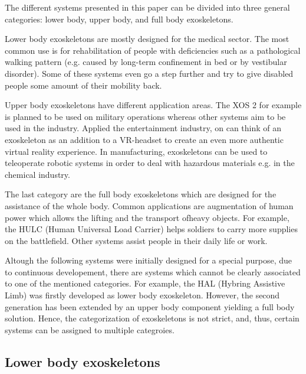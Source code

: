 \documentclass[letterpaper, 10 pt, conference]{ieeeconf}  %
\begin{document}
The different systems presented in this paper can be divided into three general categories: lower body, upper body, and
full body exoskeletons.


Lower body exoskeletons are mostly designed for the medical sector. The most common use is for rehabilitation of people
with deficiencies such as a pathological walking pattern (e.g. caused by long-term confinement in bed or by vestibular
disorder). Some of these systems even go a step further and try to give disabled people some amount of their mobility
back.


Upper body exoskeletons have different application areas. The XOS 2 for example is planned to be used on military
operations whereas other systems aim to be used in the industry. Applied the entertainment industry, on can think of
an exoskeleton as an addition to a VR-headset to create an even more authentic virtual reality experience. In
manufacturing, exoskeletons can be used to teleoperate robotic systems in order to deal with hazardous materials e.g.
in the chemical industry.


The last category are the full body exoskeletons which are designed for the assistance of the whole body.
Common applications are augmentation of human power which allows the lifting and the transport ofheavy objects.
For example, the HULC (Human Universal Load Carrier) helps soldiers to carry more supplies on the battlefield.
Other systems assist people in their daily life or work.


Altough the following systems were initially designed for a special purpose, due to continuous developement,
there are systems which cannot be clearly associated to one of the mentioned categories. For example, the HAL
(Hybring Assistive Limb) was firstly developed as lower body exoskeleton. However, the second generation has been extended
by an upper body component yielding a full body solution. Hence, the categorization of exoskeletons is
not strict, and, thus, certain systems can be assigned to multiple categroies.

\subsection{Lower body exoskeletons}
\end{document}
